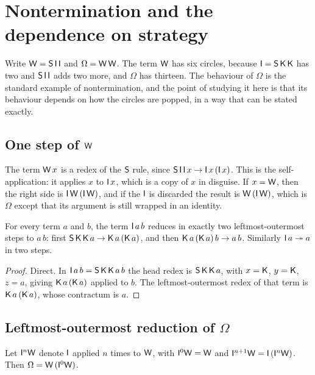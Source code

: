 \section{Nontermination and the dependence on strategy}\label{sec:nontermination}

Write $\mathsf{W}=\mathsf{S}\,\mathsf{I}\,\mathsf{I}$ and $\Omega=\mathsf{W}\,\mathsf{W}$. The term $\mathsf{W}$ has six circles, because $\mathsf{I}=\mathsf{S}\,\mathsf{K}\,\mathsf{K}$ has two and $\mathsf{S}\,\mathsf{I}\,\mathsf{I}$ adds two more, and $\Omega$ has thirteen. The behaviour of $\Omega$ is the standard example of nontermination, and the point of studying it here is that its behaviour depends on how the circles are popped, in a way that can be stated exactly.

\subsection{One step of $\mathsf{W}$}

The term $\mathsf{W}\,x$ is a redex of the $\mathsf{S}$ rule, since $\mathsf{S}\,\mathsf{I}\,\mathsf{I}\,x\rightarrow \mathsf{I}\,x\,(\mathsf{I}\,x)$. This is the self-application: it applies $x$ to $\mathsf{I}\,x$, which is a copy of $x$ in disguise. If $x=\mathsf{W}$, then the right side is $\mathsf{I}\,\mathsf{W}\,(\mathsf{I}\,\mathsf{W})$, and if the $\mathsf{I}$ is discarded the result is $\mathsf{W}\,(\mathsf{I}\,\mathsf{W})$, which is $\Omega$ except that its argument is still wrapped in an identity.

\begin{lemma}\label{lem:identity}
For every term $a$ and $b$, the term $\mathsf{I}\,a\,b$ reduces in exactly two leftmost-outermost steps to $a\,b$: first $\mathsf{S}\,\mathsf{K}\,\mathsf{K}\,a\rightarrow\mathsf{K}\,a\,(\mathsf{K}\,a)$, and then $\mathsf{K}\,a\,(\mathsf{K}\,a)\,b\rightarrow a\,b$. Similarly $\mathsf{I}\,a\twoheadrightarrow a$ in two steps.
\end{lemma}

\begin{proof}
Direct. In $\mathsf{I}\,a\,b=\mathsf{S}\,\mathsf{K}\,\mathsf{K}\,a\,b$ the head redex is $\mathsf{S}\,\mathsf{K}\,\mathsf{K}\,a$, with $x=\mathsf{K}$, $y=\mathsf{K}$, $z=a$, giving $\mathsf{K}\,a\,(\mathsf{K}\,a)$ applied to $b$. The leftmost-outermost redex of that term is $\mathsf{K}\,a\,(\mathsf{K}\,a)$, whose contractum is $a$.
\end{proof}

\subsection{Leftmost-outermost reduction of $\Omega$}

Let $\mathsf{I}^n\mathsf{W}$ denote $\mathsf{I}$ applied $n$ times to $\mathsf{W}$, with $\mathsf{I}^0\mathsf{W}=\mathsf{W}$ and $\mathsf{I}^{n+1}\mathsf{W}=\mathsf{I}\,(\mathsf{I}^n\mathsf{W})$. Then $\Omega=\mathsf{W}\,(\mathsf{I}^0\mathsf{W})$.

